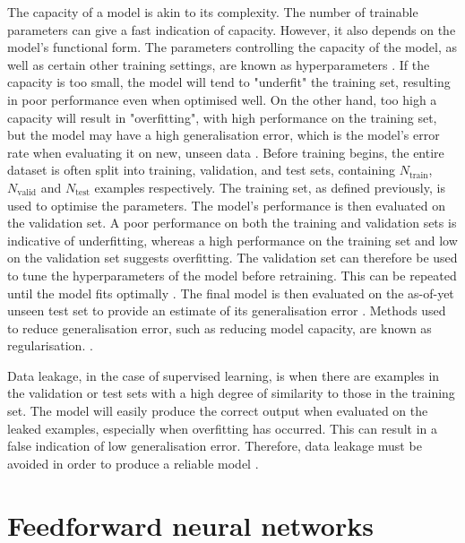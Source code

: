 \documentclass[12pt]{article}
\begin{document}
The capacity of a model is akin to its complexity. The number of trainable parameters can give a fast indication of capacity. However, it also depends on the model's functional form. The parameters controlling the capacity of the model, as well as certain other training settings, are known as hyperparameters \cite{Goodfellow16}. If the capacity is too small, the model will tend to "underfit" the training set, resulting in poor performance even when optimised well. On the other hand, too high a capacity will result in "overfitting", with high performance on the training set, but the model may have a high generalisation error, which is the model's error rate when evaluating it on new, unseen data \cite{Murphy12, Goodfellow16}. Before training begins, the entire dataset is often split into training, validation, and test sets, containing $N_{\mathrm{train}}$, $N_{\mathrm{valid}}$ and $N_{\mathrm{test}}$ examples respectively. The training set, as defined previously, is used to optimise the parameters. The model's performance is then evaluated on the validation set. A poor performance on both the training and validation sets is indicative of underfitting, whereas a high performance on the training set and low on the validation set suggests overfitting. The validation set can therefore be used to tune the hyperparameters of the model before retraining. This can be repeated until the model fits optimally \cite{Murphy12, Goodfellow16}. The final model is then evaluated on the as-of-yet unseen test set to provide an estimate of its generalisation error \cite{Murphy12}. Methods used to reduce generalisation error, such as reducing model capacity, are known as regularisation. \cite{Goodfellow16}.

Data leakage, in the case of supervised learning, is when there are examples in the validation or test sets with a high degree of similarity to those in the training set. The model will easily produce the correct output when evaluated on the leaked examples, especially when overfitting has occurred. This can result in a false indication of low generalisation error. Therefore, data leakage must be avoided in order to produce a reliable model \cite{Kaufman12}.
\section{Feedforward neural networks}
\end{document}
